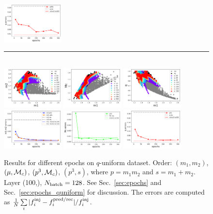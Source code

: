 \documentclass[prd,aps,twocolumn,a4paper,showkeys,nofootinbib]{revtex4-1}
\def\Mc{{\cal M}_c}
\begin{document}
\begin{figure}[]
  \includegraphics[width=0.28\textwidth]{./Figs/quniform_p3Mc_err_q.png} \\
  \rule[1ex]{14cm}{0.5pt}\\
  \includegraphics[width=0.28\textwidth]{./Figs/quniform_p3s_rainbow_m1m2.png}
  \includegraphics[width=0.28\textwidth]{./Figs/quniform_p3s_rainbow_m1Mc.png}
  \includegraphics[width=0.28\textwidth]{./Figs/quniform_p3s_rainbow_m1q.png} \\
  \includegraphics[width=0.28\textwidth]{./Figs/quniform_p3s_err_m1m2.png}
  \includegraphics[width=0.28\textwidth]{./Figs/quniform_p3s_err_Mc.png}
  \includegraphics[width=0.28\textwidth]{./Figs/quniform_p3s_err_q.png} \\
  \caption{\label{fig:epochs_quniform} Results for different epochs on $q$-uniform dataset. Order:
  $(m_1, m_2)$, $(\mu, \Mc)$, $(p^3, \Mc)$, $(p^3, s)$, where
  $p=m_1 m_2$ and $s=m_1+m_2$. Layer (100,), $N_{\rm batch}=128$. 
  See Sec.~\ref{sec:epochs} and Sec.~\ref{sec:epochs_quniform} for discussion. 
  The errors are computed as
  $\frac{1}{N} \sum\limits_i |f_i^{\rm inj} - f_i^{\rm pred/rec}|/f_i^{\rm inj}$.}
\end{figure}
\end{document}
